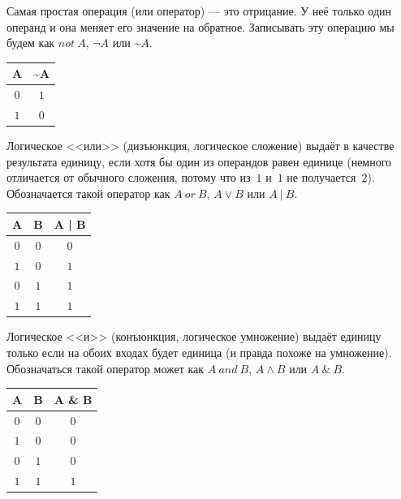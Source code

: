 Самая простая операция (или оператор) --- это отрицание. У неё только один операнд и она
меняет его значение на обратное. Записывать эту операцию мы будем как $not\ A$,
$\neg A$ или $\mbox{\textasciitilde}A$.

\begin{center}
\begin{tabular}{|c|c|}
 \hline
 \textbf{A} & \textbf{\textasciitilde A} \\ \hline
 $0$ & $1$ \\ \hline
 $1$ & $0$ \\ \hline
\end{tabular}
\end{center}

Логическое <<или>> (дизъюнкция, логическое сложение) выдаёт в качестве результата единицу,
если хотя бы один из операндов равен единице (немного отличается от обычного сложения,
потому что из~$1$ и~$1$ не получается~$2$). Обозначается такой оператор как $A\ or\ B$, $A \vee B$
или $A\ |\ B$.

\begin{center}
\begin{tabular}{|c|c|c|}
 \hline
 \textbf{A} & \textbf{B} & \textbf{A | B} \\ \hline
 $0$ & $0$ & $0$ \\ \hline
 $1$ & $0$ & $1$ \\ \hline
 $0$ & $1$ & $1$ \\ \hline
 $1$ & $1$ & $1$ \\ \hline
\end{tabular}
\end{center}

Логическое <<и>> (конъюнкция, логическое умножение) выдаёт единицу только если на обоих
входах будет единица (и правда похоже на умножение). Обозначаться такой
оператор может как $A\ and\ B$, $A \wedge B$ или $A\ \mbox{\&}\ B$.

\begin{center}
\begin{tabular}{|c|c|c|}
 \hline
 \textbf{A} & \textbf{B} & \textbf{A \& B} \\ \hline
 $0$ & $0$ & $0$ \\ \hline
 $1$ & $0$ & $0$ \\ \hline
 $0$ & $1$ & $0$ \\ \hline
 $1$ & $1$ & $1$ \\ \hline
\end{tabular}
\end{center}

